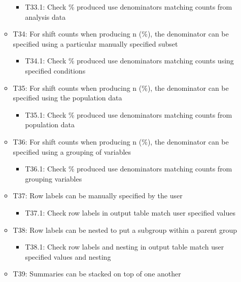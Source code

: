 \documentclass[
]{article}
\providecommand{\tightlist}{%
  \setlength{\itemsep}{0pt}\setlength{\parskip}{0pt}}
\begin{document}
\begin{itemize}
\begin{itemize}
    \begin{itemize}
    \tightlist
    \item
      T33.1: Check \% produced use denominators matching counts from
      analysis data
    \end{itemize}
  \item
    T34: For shift counts when producing n (\%), the denominator can be
    specified using a particular manually specified subset

    \begin{itemize}
    \tightlist
    \item
      T34.1: Check \% produced use denominators matching counts using
      specified conditions
    \end{itemize}
  \item
    T35: For shift counts when producing n (\%), the denominator can be
    specified using the population data

    \begin{itemize}
    \tightlist
    \item
      T35.1: Check \% produced use denominators matching counts from
      population data
    \end{itemize}
  \item
    T36: For shift counts when producing n (\%), the denominator can be
    specified using a grouping of variables

    \begin{itemize}
    \tightlist
    \item
      T36.1: Check \% produced use denominators matching counts from
      grouping variables
    \end{itemize}
  \item
    T37: Row labels can be manually specified by the user

    \begin{itemize}
    \tightlist
    \item
      T37.1: Check row labels in output table match user specified
      values
    \end{itemize}
  \item
    T38: Row labels can be nested to put a subgroup within a parent
    group

    \begin{itemize}
    \tightlist
    \item
      T38.1: Check row labels and nesting in output table match user
      specified values and nesting
    \end{itemize}
  \item
    T39: Summaries can be stacked on top of one another


\end{itemize}
\end{itemize}
\end{document}
